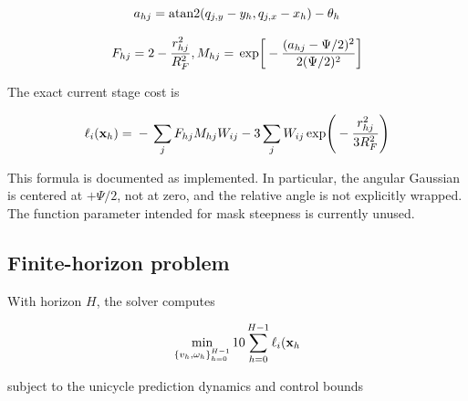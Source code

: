 \documentclass[11pt]{article}
\begin{document}
\begin{equation}
a_{hj} \\
= \\
\mathrm{atan2} \\
(q_{j,y}-y_h,q_{j,x}-x_h)-\theta_h
\end{equation}


\begin{equation}
F_{hj}=2-\frac{r_{hj}^2}{R_F^2}, \\
\qquad \\
M_{hj} \\
= \\
\exp\!\left[ \\
-\frac{(a_{hj}-\Psi/2)^2}{2(\Psi/2)^2} \\
\right]
\end{equation}


The exact current stage cost is


\begin{equation}
\ell_i(\mathbf x_h) \\
= \\
- \\
\sum_jF_{hj}M_{hj}W_{ij} \\
- \\
3\sum_j \\
W_{ij} \\
\exp\!\left( \\
-\frac{r_{hj}^2}{3R_F^2} \\
\right)
\end{equation}


This formula is documented as implemented. In particular, the angular Gaussian is centered at $+\Psi/2$, not at zero, and the relative angle is not explicitly wrapped. The function parameter intended for mask steepness is currently unused.


\subsection{Finite-horizon problem}


With horizon $H$, the solver computes


\begin{equation}
\min_{\{v_h,\omega_h\}_{h=0}^{H-1}} \\
\quad \\
10\sum_{h=0}^{H-1}\ell_i(\mathbf x_h
\end{equation}


subject to the unicycle prediction dynamics and control bounds
\end{document}
